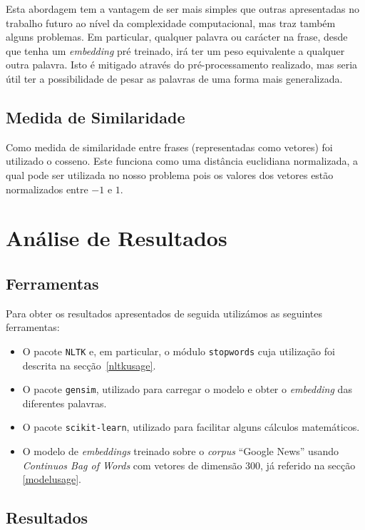 \documentclass[a4paper,twocolumn]{article}
\begin{document}
Esta abordagem tem a vantagem de ser mais simples que outras apresentadas no trabalho futuro ao nível da complexidade computacional, mas traz também alguns  problemas. Em particular, qualquer palavra ou carácter na frase, desde que tenha um \textit{embedding} pré treinado, irá ter um peso equivalente a qualquer outra palavra. Isto é mitigado através do pré-processamento realizado, mas seria útil ter a possibilidade de pesar as palavras de uma forma mais generalizada.

\subsection{Medida de Similaridade}
Como medida de similaridade entre frases (representadas como vetores) foi utilizado o cosseno. Este funciona como uma distância euclidiana normalizada, a qual pode ser utilizada no nosso problema pois os valores dos vetores estão normalizados entre $-1$ e $1$.

\section{Análise de Resultados}

\subsection{Ferramentas}
Para obter os resultados apresentados de seguida utilizámos as seguintes ferramentas:
\begin{itemize}
    \item O pacote \texttt{NLTK} e, em particular, o módulo \texttt{stopwords} cuja utilização foi descrita na secção~\ref{nltkusage}.
    
    \item O pacote \texttt{gensim}, utilizado para carregar o modelo e obter o \textit{embedding} das diferentes palavras.
    
    \item O pacote \texttt{scikit-learn}, utilizado para facilitar alguns cálculos matemáticos.
    
    \item O modelo de \textit{embeddings} treinado sobre o \textit{corpus} ``Google News'' usando \textit{Continuos Bag of Words} com vetores de dimensão 300, já referido na secção \ref{modelusage}.
\end{itemize}

\subsection{Resultados}
\end{document}
